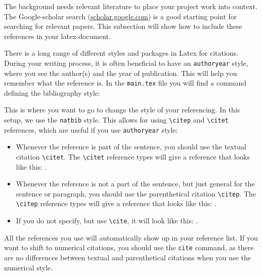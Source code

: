 The background needs relevant literature to place your project work into context. The Google-scholar search (\url{scholar.google.com}) is a good starting point for searching for relevant papers.  This subsection will show how to include these references in your latex-document.

There is a long range of different styles and packages in Latex for citations. During your writing process, it is often beneficial to have an \texttt{authoryear} style, where you see the author(s) and the year of publication. This will help you remember what the reference is. In the \texttt{main.tex} file you will find a command defining the bibliography style:


This is where you want to go to change the style of your referencing. In this setup, we use the \texttt{natbib} style. This allows for using \verb=\citep= and \verb=\citet= references, which are useful if you use \texttt{authoryear} style:
\begin{itemize}
    \item Whenever the reference is part of the sentence, you should use the textual citation \verb=\citet=. The \verb=\citet= reference types will give a reference that looks like this: \citet{berg2014permeability}.
    \item Whenever the reference is not a part of the sentence, but just general for the sentence or paragraph, you should use the parenthetical citation \verb=\citep=. The \verb=\citep= reference types will give a reference that looks like this: \citep{berg2014permeability}.
    \item If you do not specify, but use \verb=\cite=, it will look like this: \cite{berg2014permeability}.
\end{itemize}

All the references you use will automatically show up in your reference list. If you want to shift to numerical citations, you should use the \texttt{cite} command, as there are no differences between textual and parenthetical citations when you use the numerical style.